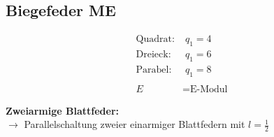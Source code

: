 \subsection{Biegefeder \hfill ME}
\begin{footnotesize}
    \begin{center}
        \begin{minipage}{0.5\linewidth}
        \end{minipage}
        \begin{minipage}{0.48\linewidth}
            \begin{scriptsize}
                \begin{align*}
                    \text{Quadrat:}& \; q_1 = 4
                    \\\text{Dreieck:}& \; q_1 = 6
                    \\\text{Parabel:}& \; q_1 = 8
                    \\~\\ E &= \text{E-Modul}
                \end{align*}
            \end{scriptsize}
        \end{minipage}
    \end{center}
    \scriptsize{\textbf{Zweiarmige Blattfeder:} \\$\to$ Parallelschaltung zweier einarmiger Blattfedern mit $l = \frac{1}{2}$}
\end{footnotesize}